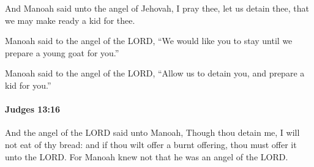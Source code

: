 			\begin{versebox}
					\item[BHS] 
					\item[ASV] And Manoah said unto the angel of Jehovah, I pray thee, let us detain thee, that we may make ready a kid for thee.
					\item[NIV] Manoah said to the angel of the LORD, “We would like you to stay until we prepare a young goat for you.”
					\item[NRSV] Manoah said to the angel of the LORD, “Allow us to detain you, and prepare a kid for you.”
			\end{versebox}

		\paragraph{Judges 13:16} %
			\label{JUDGES-13-16}

			And the angel of the LORD said unto Manoah, Though thou detain me, I will not eat of thy bread: and if thou wilt offer a burnt offering, thou must offer it unto the LORD. For Manoah knew not that he was an angel of the LORD.

